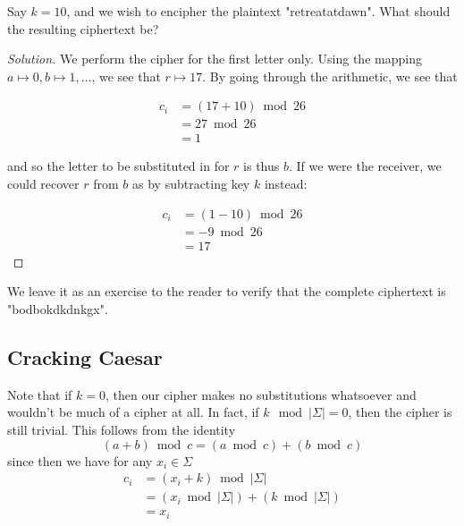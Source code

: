 \documentclass{paper}
\newenvironment{wexample}[2][Worked example:]{\begin{trivlist}
\item[\hskip \labelsep {\bfseries #1}\hskip \labelsep {\bfseries #2.}]}{\end{trivlist}}
\newenvironment{solution}{\begin{proof}[Solution]}{\end{proof}}
\newenvironment{ybox}{\begin{tcolorbox}[breakable,colback=yellow!20!white,colframe=brown!100!black]}{\end{tcolorbox}}
\begin{document}
\bigskip
\begin{ybox}
    \begin{wexample}{Encrypting using a Caesar cipher}
        Say $k = 10$, and we wish to encipher the plaintext "retreatatdawn". What should the resulting ciphertext be?
    \end{wexample}
    \begin{solution}
        We perform the cipher for the first letter only. Using the mapping $a \mapsto 0, b \mapsto 1, \dots$, we see that $r \mapsto 17$. By going through the arithmetic, we see that 
        
        \begin{equation*}
            \begin{split}
            c_i & = (17 + 10) \bmod 26 \\
             & = 27  \bmod 26 \\
             & = 1
            \end{split}
        \end{equation*}
        
        and so the letter to be substituted in for $r$ is thus $b$. If we were the receiver, we could recover $r$ from $b$ as by subtracting key $k$ instead:
        
        \begin{equation*}
            \begin{split}
            c_i & = (1 - 10) \bmod 26 \\
             & = -9 \bmod 26 \\
             & = 17
            \end{split}
        \end{equation*}
    \end{solution}
    
     We leave it as an exercise to the reader to verify that the complete ciphertext is "bodbokdkdnkgx".
\end{ybox}

\subsection{Cracking Caesar}

\medskip Note that if $k = 0$, then our cipher makes no substitutions whatsoever and wouldn't be much of a cipher at all. In fact, if $k \mod |\Sigma| = 0$, then the cipher is still trivial. This follows from the identity 
\begin{equation}
    (a + b) \bmod c = (a \bmod c) + (b \bmod c)
\end{equation}
since then we have for any $x_i \in \Sigma$
\begin{equation*}
    \begin{split}
    c_i & = (x_i + k) \bmod |\Sigma| \\
     & = (x_i \bmod |\Sigma|) + (k \bmod |\Sigma|) \\
     & = x_i 
    \end{split}
\end{equation*}
\end{document}
